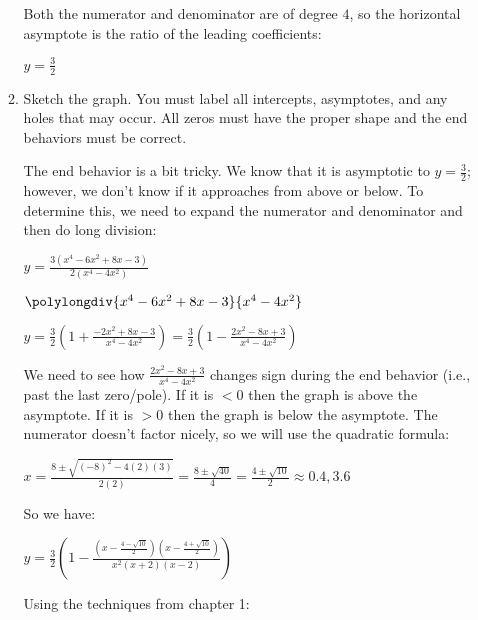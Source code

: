 \documentclass[letterpaper,12pt,fleqn]{article}
\begin{document}
\begin{enumerate}
\begin{enumerate}
    Both the numerator and denominator are of degree $4$, so the horizontal
    asymptote is the ratio of the leading coefficients:

    $y=\frac{3}{2}$
    
  \item Sketch the graph. You must label all intercepts, asymptotes, and any
    holes that may occur. All zeros must have the proper shape and the end
    behaviors must be correct.

    The end behavior is a bit tricky. We know that it is asymptotic to
    $y=\frac{3}{2}$; however, we don't know if it approaches from above or
    below. To determine this, we need to expand the numerator and denominator
    and then do long division:

    $y=\frac{3(x^4-6x^2+8x-3)}{2(x^4-4x^2)}$

    $\polylongdiv{x^4-6x^2+8x-3}{x^4-4x^2}$

    $y=\frac{3}{2}\left(1+\frac{-2x^2+8x-3}{x^4-4x^2}\right)=
    \frac{3}{2}\left(1-\frac{2x^2-8x+3}{x^4-4x^2}\right)$

    We need to see how $\frac{2x^2-8x+3}{x^4-4x^2}$ changes sign during the
    end behavior (i.e., past the last zero/pole). If it is $<0$ then the
    graph is above the asymptote. If it is $>0$ then the graph is below the
    asymptote. The numerator doesn't factor nicely, so we will use the
    quadratic formula:

    $x=\frac{8\pm\sqrt{(-8)^2-4(2)(3)}}{2(2)}=
    \frac{8\pm\sqrt{40}}{4}=\frac{4\pm\sqrt{10}}{2}\approx0.4,3.6$

    So we have:

    $y=\frac{3}{2}\left(1-\frac{
      \left(x-\frac{4-\sqrt{10}}{2}\right)
      \left(x-\frac{4+\sqrt{10}}{2}\right)}
    {x^2(x+2)(x-2)}\right)$

    Using the techniques from chapter 1:



\end{enumerate}
\end{enumerate}
\end{document}
